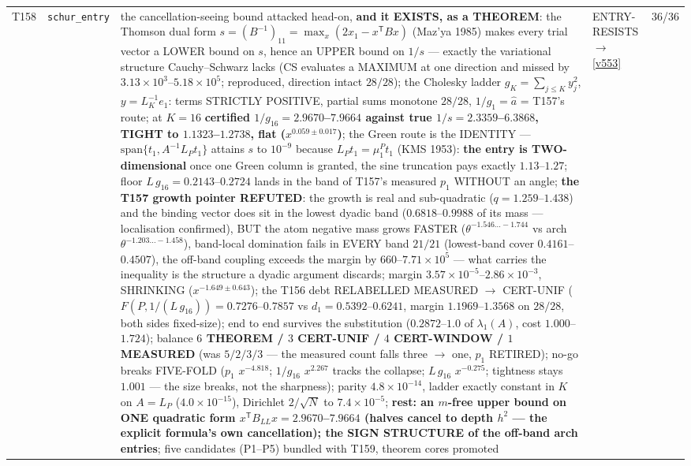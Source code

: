\documentclass[11pt,a4paper]{article}
\begin{document}
{\begin{xltabular}{\linewidth}{@{}p{0.95cm} >{\raggedright\arraybackslash}p{3.1cm} Y >{\raggedright\scriptsize\arraybackslash}p{3.35cm} p{1.15cm}@{}}
T158 & \texttt{\scriptsize schur\_\allowbreak entry} & the cancellation-seeing bound attacked head-on, \textbf{and it EXISTS, as a THEOREM}: the Thomson dual form $s=(B^{-1})_{11}=\max_x(2x_1-x^{\mathsf T}Bx)$ (Maz'ya 1985) makes every trial vector a LOWER bound on $s$, hence an UPPER bound on $1/s$ --- exactly the variational structure Cauchy--Schwarz lacks (CS evaluates a MAXIMUM at one direction and missed by $3.13\times10^{3}$--$5.18\times10^{5}$; reproduced, direction intact $28/28$); the Cholesky ladder $g_K=\sum_{j\le K}y_j^2$, $y=L_K^{-1}e_1$: terms STRICTLY POSITIVE, partial sums monotone $28/28$, $1/g_1=\hat a$ = T157's route; at $K=16$ \textbf{certified $1/g_{16}=2.9670$--$7.9664$ against true $1/s=2.3359$--$6.3868$, TIGHT to $1.1323$--$1.2738$, flat ($x^{0.059\pm0.017}$)}; the Green route is the IDENTITY --- $\mathrm{span}\{t_1,A^{-1}L_Pt_1\}$ attains $s$ to $10^{-9}$ because $L_Pt_1=\mu^P_1t_1$ (KMS 1953): \textbf{the entry is TWO-dimensional} once one Green column is granted, the sine truncation pays exactly $1.13$--$1.27$; floor $L\,g_{16}=0.2143$--$0.2724$ lands in the band of T157's measured $p_1$ WITHOUT an angle; \textbf{the T157 growth pointer REFUTED}: the growth is real and sub-quadratic ($q=1.259$--$1.438$) and the binding vector does sit in the lowest dyadic band ($0.6818$--$0.9988$ of its mass --- localisation confirmed), BUT the atom negative mass grows FASTER ($\theta^{-1.546\ldots-1.744}$ vs arch $\theta^{-1.203\ldots-1.458}$), band-local domination fails in EVERY band $21/21$ (lowest-band cover $0.4161$--$0.4507$), the off-band coupling exceeds the margin by $660$--$7.71\times10^{5}$ --- what carries the inequality is the structure a dyadic argument discards; margin $3.57\times10^{-5}$--$2.86\times10^{-3}$, SHRINKING ($x^{-1.649\pm0.643}$); the T156 debt RELABELLED MEASURED $\to$ CERT-UNIF ($F(P,1/(L\,g_{16}))=0.7276$--$0.7857$ vs $d_1=0.5392$--$0.6241$, margin $1.1969$--$1.3568$ on $28/28$, both sides fixed-size); end to end survives the substitution ($0.2872$--$1.0$ of $\lambda_1(A)$, cost $1.000$--$1.724$); balance \textbf{$6$ THEOREM / $3$ CERT-UNIF / $4$ CERT-WINDOW / $1$ MEASURED} (was $5/2/3/3$ --- the measured count falls three $\to$ one, $p_1$ RETIRED); no-go breaks FIVE-FOLD ($p_1$ $x^{-4.818}$; $1/g_{16}$ $x^{2.267}$ tracks the collapse; $L\,g_{16}$ $x^{-0.275}$; tightness stays $1.001$ --- the size breaks, not the sharpness); parity $4.8\times10^{-14}$, ladder exactly constant in $K$ on $A=L_P$ ($4.0\times10^{-15}$), Dirichlet $2/\sqrt N$ to $7.4\times10^{-5}$; \textbf{rest: an $m$-free upper bound on ONE quadratic form $x^{\mathsf T}B_{LL}x=2.9670$--$7.9664$ (halves cancel to depth $h^2$ --- the explicit formula's own cancellation); the SIGN STRUCTURE of the off-band arch entries}; five candidates (P1--P5) bundled with T159, theorem cores promoted & ENTRY-RESISTS $\to$ \vref{v553} & 36/36\\

\end{xltabular}}
\end{document}
